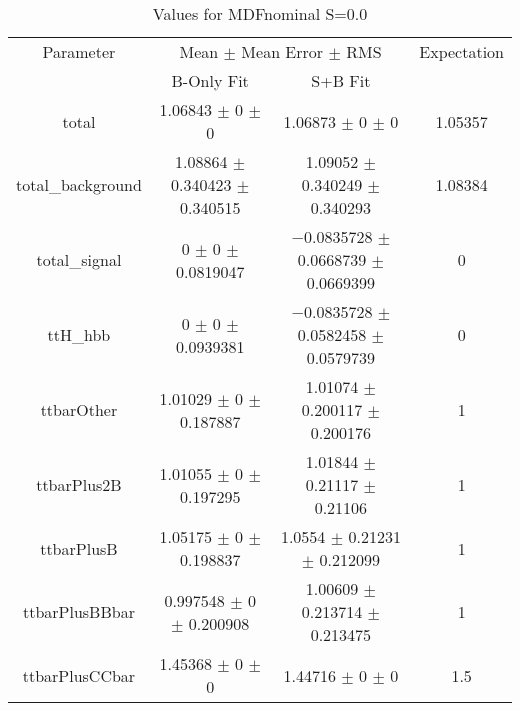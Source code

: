 \begin{table}
\centering
\caption{Values for MDFnominal S=0.0}
\begin{tabular}{cccc}
\toprule
Parameter & \multicolumn{2}{c}{Mean $\pm$ Mean Error $\pm$ RMS} & Expectation\\
 & B-Only Fit & S+B Fit & \\
\midrule
total & \num{1.06843} $\pm$ \num{0} $\pm$ \num{0} & \num{1.06873} $\pm$ \num{0} $\pm$ \num{0} & \num{1.05357}\\
total\_background & \num{1.08864} $\pm$ \num{0.340423} $\pm$ \num{0.340515} & \num{1.09052} $\pm$ \num{0.340249} $\pm$ \num{0.340293} & \num{1.08384}\\
total\_signal & \num{0} $\pm$ \num{0} $\pm$ \num{0.0819047} & \num{-0.0835728} $\pm$ \num{0.0668739} $\pm$ \num{0.0669399} & \num{0}\\
ttH\_hbb & \num{0} $\pm$ \num{0} $\pm$ \num{0.0939381} & \num{-0.0835728} $\pm$ \num{0.0582458} $\pm$ \num{0.0579739} & \num{0}\\
ttbarOther & \num{1.01029} $\pm$ \num{0} $\pm$ \num{0.187887} & \num{1.01074} $\pm$ \num{0.200117} $\pm$ \num{0.200176} & \num{1}\\
ttbarPlus2B & \num{1.01055} $\pm$ \num{0} $\pm$ \num{0.197295} & \num{1.01844} $\pm$ \num{0.21117} $\pm$ \num{0.21106} & \num{1}\\
ttbarPlusB & \num{1.05175} $\pm$ \num{0} $\pm$ \num{0.198837} & \num{1.0554} $\pm$ \num{0.21231} $\pm$ \num{0.212099} & \num{1}\\
ttbarPlusBBbar & \num{0.997548} $\pm$ \num{0} $\pm$ \num{0.200908} & \num{1.00609} $\pm$ \num{0.213714} $\pm$ \num{0.213475} & \num{1}\\
ttbarPlusCCbar & \num{1.45368} $\pm$ \num{0} $\pm$ \num{0} & \num{1.44716} $\pm$ \num{0} $\pm$ \num{0} & \num{1.5}\\
\bottomrule
\end{tabular}
\end{table}